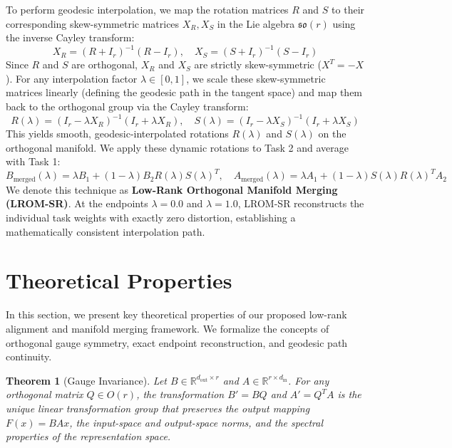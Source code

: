 \documentclass{article}
\theoremstyle{plain}
\newtheorem{theorem}{Theorem}[section]
\theoremstyle{definition}
\theoremstyle{remark}
\begin{document}
To perform geodesic interpolation, we map the rotation matrices $R$ and $S$ to their corresponding skew-symmetric matrices $X_R, X_S$ in the Lie algebra $\mathfrak{so}(r)$ using the inverse Cayley transform:
\begin{equation}
X_R = (R + I_r)^{-1}(R - I_r), \quad X_S = (S + I_r)^{-1}(S - I_r)
\end{equation}
Since $R$ and $S$ are orthogonal, $X_R$ and $X_S$ are strictly skew-symmetric ($X^T = -X$). For any interpolation factor $\lambda \in [0, 1]$, we scale these skew-symmetric matrices linearly (defining the geodesic path in the tangent space) and map them back to the orthogonal group via the Cayley transform:
\begin{equation}
R(\lambda) = (I_r - \lambda X_R)^{-1}(I_r + \lambda X_R), \quad S(\lambda) = (I_r - \lambda X_S)^{-1}(I_r + \lambda X_S)
\end{equation}
This yields smooth, geodesic-interpolated rotations $R(\lambda)$ and $S(\lambda)$ on the orthogonal manifold. We apply these dynamic rotations to Task 2 and average with Task 1:
\begin{equation}
B_{\text{merged}}(\lambda) = \lambda B_1 + (1-\lambda) B_2 R(\lambda) S(\lambda)^T, \quad A_{\text{merged}}(\lambda) = \lambda A_1 + (1-\lambda) S(\lambda) R(\lambda)^T A_2
\end{equation}
We denote this technique as \textbf{Low-Rank Orthogonal Manifold Merging (LROM-SR)}. At the endpoints $\lambda = 0.0$ and $\lambda = 1.0$, LROM-SR reconstructs the individual task weights with exactly zero distortion, establishing a mathematically consistent interpolation path.
\section{Theoretical Properties}
\label{sec:theory}
In this section, we present key theoretical properties of our proposed low-rank alignment and manifold merging framework. We formalize the concepts of orthogonal gauge symmetry, exact endpoint reconstruction, and geodesic path continuity.

\begin{theorem}[Gauge Invariance]
Let $B \in \mathbb{R}^{d_{\text{out}} \times r}$ and $A \in \mathbb{R}^{r \times d_{\text{in}}}$. For any orthogonal matrix $Q \in O(r)$, the transformation $B' = BQ$ and $A' = Q^T A$ is the unique linear transformation group that preserves the output mapping $F(x) = BAx$, the input-space and output-space norms, and the spectral properties of the representation space.
\end{theorem}
\end{document}
